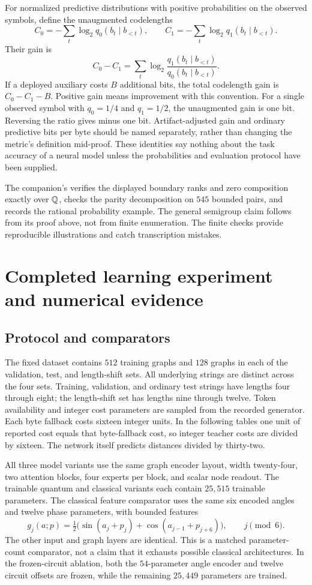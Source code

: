 For normalized predictive distributions with positive probabilities on
the observed symbols, define the unaugmented codelengths
\[
 C_0=-\sum_t\log_2q_0(b_t\mid b_{<t}),\qquad
 C_1=-\sum_t\log_2q_1(b_t\mid b_{<t}).
\]
Their gain is
\[
 C_0-C_1=\sum_t\log_2\frac{q_1(b_t\mid b_{<t})}
                                  {q_0(b_t\mid b_{<t})}.
\]
If a deployed auxiliary costs $B$ additional bits, the total codelength
gain is $C_0-C_1-B$. Positive gain means improvement with this convention.
For a single observed symbol with $q_0=1/4$ and $q_1=1/2$, the
unaugmented gain is one bit. Reversing the ratio gives minus one bit.
Artifact-adjusted gain and ordinary predictive bits per byte should be
named separately, rather than changing the metric's definition mid-proof.
These identities say nothing about the task accuracy of a neural model
unless the probabilities and evaluation protocol have been supplied.

The companion's  verifies the displayed boundary
ranks and zero composition exactly over $\mathbb{Q}$, checks the parity
decomposition on $545$ bounded pairs, and records the rational probability
example. The general semigroup claim follows from its proof above, not
from finite enumeration. The finite checks provide reproducible
illustrations and catch transcription mistakes.

\section{Completed learning experiment and numerical evidence}

\subsection{Protocol and comparators}

The fixed dataset contains $512$ training graphs and $128$ graphs in each
of the validation, test, and length-shift sets. All underlying strings
are distinct across the four sets. Training, validation, and ordinary
test strings have lengths four through eight; the length-shift set has
lengths nine through twelve. Token availability and integer cost parameters
are sampled from the recorded generator. Each byte fallback costs sixteen
integer units. In the following tables one unit of reported cost equals
that byte-fallback cost, so integer teacher costs are divided by sixteen.
The network itself predicts distances divided by thirty-two.

All three model variants use the same graph encoder layout, width
twenty-four, two attention blocks, four experts per block, and scalar node
readout. The trainable quantum and classical variants each contain
$25{,}515$ trainable parameters. The classical feature comparator uses
the same six encoded angles and twelve phase parameters, with bounded
features
\[
 g_j(a;p)=\tfrac12\bigl(\sin(a_j+p_j)
             +\cos(a_{j-1}+p_{j+6})\bigr),\qquad j\pmod6.
\]
The other input and graph layers are identical. This is a matched
parameter-count comparator, not a claim that it exhausts possible
classical architectures. In the frozen-circuit ablation, both the
$54$-parameter angle encoder and twelve circuit offsets are frozen, while
the remaining $25{,}449$ parameters are trained.

